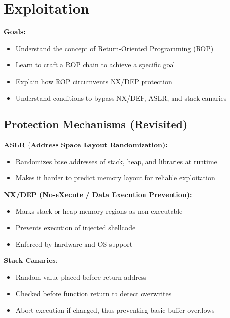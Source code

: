 \section{Exploitation}

\textbf{Goals:}
\begin{itemize}[noitemsep]
  \item Understand the concept of Return-Oriented Programming (ROP)
  \item Learn to craft a ROP chain to achieve a specific goal
  \item Explain how ROP circumvents NX/DEP protection
  \item Understand conditions to bypass NX/DEP, ASLR, and stack canaries
\end{itemize}

\subsection{Protection Mechanisms (Revisited)}
{
  \textbf{ASLR (Address Space Layout Randomization):}
  \begin{itemize}[noitemsep]
    \item Randomizes base addresses of stack, heap, and libraries at runtime
    \item Makes it harder to predict memory layout for reliable exploitation
  \end{itemize}
  
  \item \textbf{NX/DEP (No-eXecute / Data Execution Prevention):}
  \begin{itemize}[noitemsep]
    \item Marks stack or heap memory regions as non-executable
    \item Prevents execution of injected shellcode
    \item Enforced by hardware and OS support
  \end{itemize}
  
  \item \textbf{Stack Canaries:}
  \begin{itemize}[noitemsep]
    \item Random value placed before return address
    \item Checked before function return to detect overwrites
    \item Abort execution if changed, thus preventing basic buffer overflows
  \end{itemize}
}

